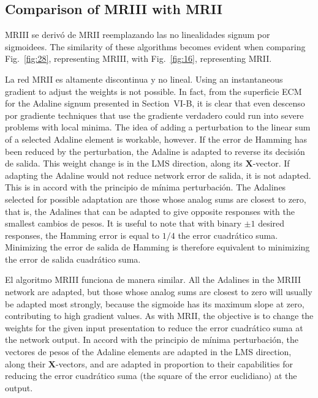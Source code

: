 \documentclass[10pt,twocolumn]{article}
\newcommand{\X}{\bm{X}}
\begin{document}
\subsection{Comparison of MRIII with MRII}
MRIII se derivó de MRII reemplazando las no linealidades signum por sigmoidees.
The similarity of these algorithms becomes evident when comparing Fig.~\ref{fig:28},
representing MRIII, with Fig.~\ref{fig:16}, representing MRII.

La red MRII es altamente discontinua y no lineal. Using an instantaneous
gradient to adjust the weights is not possible. In fact, from the superficie ECM for
the Adaline signum presented in Section~VI-B, it is clear that even descenso por gradiente
techniques that use the gradiente verdadero could run into severe problems with local
minima. The idea of adding a perturbation to the linear sum of a selected Adaline
element is workable, however. If the error de Hamming has been reduced by the
perturbation, the Adaline is adapted to reverse its decisión de salida. This weight
change is in the LMS direction, along its $\X$-vector. If adapting the Adaline would
not reduce network error de salida, it is not adapted. This is in accord with the
principio de mínima perturbación. The Adalines selected for possible adaptation are
those whose analog sums are closest to zero, that is, the Adalines that can be
adapted to give opposite responses with the smallest cambios de pesos. It is useful to
note that with binary $\pm 1$ desired responses, the Hamming error is equal to
$1/4$ the error cuadrático suma. Minimizing the error de salida de Hamming is therefore
equivalent to minimizing the error de salida cuadrático suma.

El algoritmo MRIII funciona de manera similar. All the Adalines in the MRIII network
are adapted, but those whose analog sums are closest to zero will usually be adapted
most strongly, because the sigmoide has its maximum slope at zero, contributing to
high gradient values. As with MRII, the objective is to change the weights for the
given input presentation to reduce the error cuadrático suma at the network output. In
accord with the principio de mínima perturbación, the vectores de pesos of the Adaline
elements are adapted in the LMS direction, along their $\X$-vectors, and are adapted
in proportion to their capabilities for reducing the error cuadrático suma (the square of
the error euclidiano) at the output.
\end{document}
